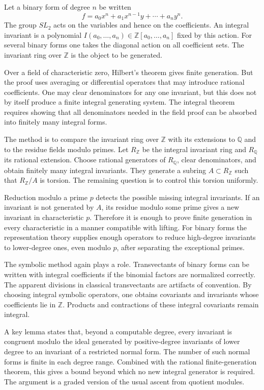 \documentclass[11pt]{article}
\begin{document}
Let a binary form of degree \(n\) be written \[   f=a_0x^n+a_1x^{n-1}y+\cdots+a_ny^n. \] The group
\(SL_2\) acts on the variables and hence on the coefficients. An integral invariant is a polynomial
\(I(a_0, \ldots,a_n)\in\mathbb Z[a_0, \ldots,a_n]\) fixed by this action. For several binary forms
one takes the diagonal action on all coefficient sets. The invariant ring over \(\mathbb Z\) is the
object to be generated.


Over a field of characteristic zero, Hilbert's theorem gives finite generation. But the proof uses
averaging or differential operators that may introduce rational coefficients. One may clear
denominators for any one invariant, but this does not by itself produce a finite integral generating
system. The integral theorem requires showing that all denominators needed in the field proof can be
absorbed into finitely many integral forms.


The method is to compare the invariant ring over \(\mathbb Z\) with its extensions to \(\mathbb Q\)
and to the residue fields modulo primes. Let \(R_\mathbb Z\) be the integral invariant ring and
\(R_\mathbb Q\) its rational extension. Choose rational generators of \(R_\mathbb Q\), clear
denominators, and obtain finitely many integral invariants. They generate a subring \(A\subset
R_\mathbb Z\) such that \(R_\mathbb Z/A\) is torsion. The remaining question is to control this
torsion uniformly.


Reduction modulo a prime \(p\) detects the possible missing integral invariants. If an invariant is
not generated by \(A\), its residue modulo some prime gives a new invariant in characteristic \(p\).
Therefore it is enough to prove finite generation in every characteristic in a manner compatible
with lifting. For binary forms the representation theory supplies enough operators to reduce
high-degree invariants to lower-degree ones, even modulo \(p\), after separating the exceptional
primes.


The symbolic method again plays a role. Transvectants of binary forms can be written with integral
coefficients if the binomial factors are normalized correctly. The apparent divisions in classical
transvectants are artifacts of convention. By choosing integral symbolic operators, one obtains
covariants and invariants whose coefficients lie in \(\mathbb Z\). Products and contractions of
these integral covariants remain integral.


A key lemma states that, beyond a computable degree, every invariant is congruent modulo the ideal
generated by positive-degree invariants of lower degree to an invariant of a restricted normal form.
The number of such normal forms is finite in each degree range. Combined with the rational
finite-generation theorem, this gives a bound beyond which no new integral generator is required.
The argument is a graded version of the usual ascent from quotient modules.
\end{document}

